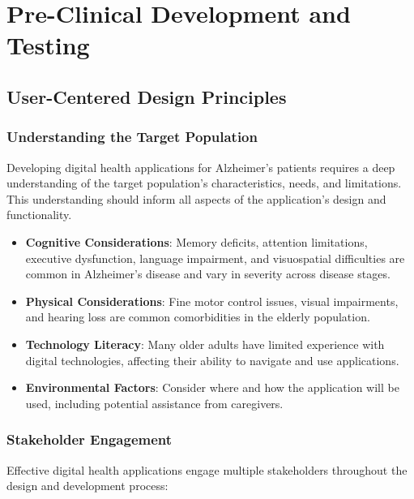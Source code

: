 \chapter{Pre-Clinical Development and Testing}

\section{User-Centered Design Principles}
\subsection{Understanding the Target Population}
Developing digital health applications for Alzheimer's patients requires a deep understanding of the target population's characteristics, needs, and limitations. This understanding should inform all aspects of the application's design and functionality.

\begin{itemize}
    \item \textbf{Cognitive Considerations}: Memory deficits, attention limitations, executive dysfunction, language impairment, and visuospatial difficulties are common in Alzheimer's disease and vary in severity across disease stages.
    
    \item \textbf{Physical Considerations}: Fine motor control issues, visual impairments, and hearing loss are common comorbidities in the elderly population.
    
    \item \textbf{Technology Literacy}: Many older adults have limited experience with digital technologies, affecting their ability to navigate and use applications.
    
    \item \textbf{Environmental Factors}: Consider where and how the application will be used, including potential assistance from caregivers.
\end{itemize}

\subsection{Stakeholder Engagement}
Effective digital health applications engage multiple stakeholders throughout the design and development process:

